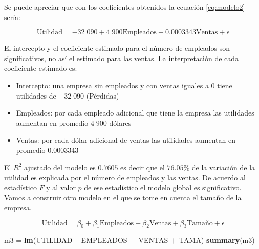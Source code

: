\documentclass[letterpaper,]{book}
\newenvironment{Shaded}{\begin{snugshade}}{\end{snugshade}}
\newcommand{\KeywordTok}[1]{\textcolor[rgb]{0.13,0.29,0.53}{\textbf{#1}}}
\newcommand{\NormalTok}[1]{#1}
\newcommand{\OperatorTok}[1]{\textcolor[rgb]{0.81,0.36,0.00}{\textbf{#1}}}
\newcommand{\StringTok}[1]{\textcolor[rgb]{0.31,0.60,0.02}{#1}}
\providecommand{\tightlist}{%
  \setlength{\itemsep}{0pt}\setlength{\parskip}{0pt}}
\begin{document}
Se puede apreciar que con los coeficientes obtenidos la ecuación \eqref{eq:modelo2} sería:

\begin{equation}
  \text{Utilidad} = -32\;090 + 4\;900 \text{Empleados} + 0.0003343 \text{Ventas} + \epsilon
    \label{eq:modelo3}
\end{equation}

El intercepto y el coeficiente estimado para el número de empleados son significativos, no así el estimado para las ventas. La interpretación de cada coeficiente estimado es:

\begin{itemize}
\tightlist
\item
  Intercepto: una empresa sin empleados y con ventas iguales a 0 tiene utilidades de \(-32\;090\) (Pérdidas)
\item
  Empleados: por cada empleado adicional que tiene la empresa las utilidades aumentan en promedio \(4\;900\) dólares
\item
  Ventas: por cada dólar adicional de ventas las utilidades aumentan en promedio \(0.0003343\)
\end{itemize}

El \(R^2\) ajustado del modelo es \(0.7605\) es decir que el \(76.05\)\% de la variación de la utilidad es explicada por el número de empleados y las ventas. De acuerdo al estadístico \(F\) y al valor \(p\) de ese estadístico el modelo global es significativo.
Vamos a construir otro modelo en el que se tome en cuenta el tamaño de la empresa.

\begin{equation}
  \text{Utilidad} = \beta_0 + \beta_1 \text{Empleados} + \beta_2 \text{Ventas} + \beta_3 \text{Tamaño} + \epsilon
    \label{eq:modelo4}
\end{equation}

\begin{Shaded}
\begin{Highlighting}[]
\NormalTok{m3 =}\StringTok{ }\KeywordTok{lm}\NormalTok{(UTILIDAD }\OperatorTok{~}\StringTok{ }\NormalTok{EMPLEADOS }\OperatorTok{+}\StringTok{ }\NormalTok{VENTAS }\OperatorTok{+}\StringTok{ }\NormalTok{TAMA)}
\KeywordTok{summary}\NormalTok{(m3)}
\end{Highlighting}
\end{Shaded}
\end{document}
